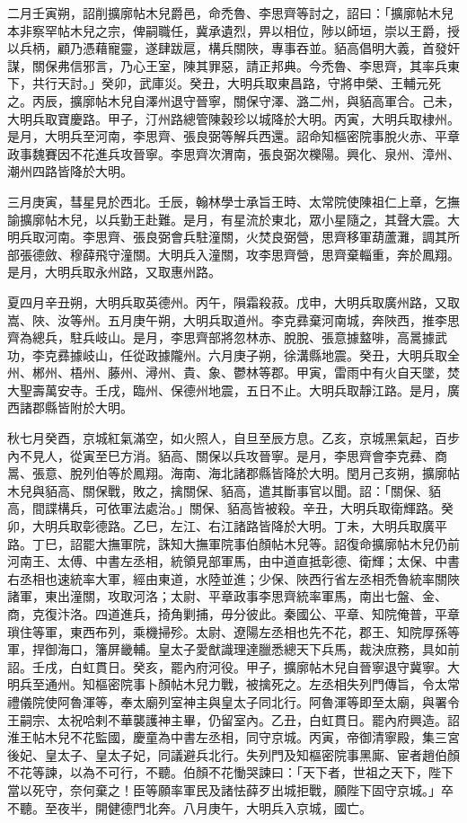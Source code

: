 \begin{pinyinscope}
 二月壬寅朔，詔削擴廓帖木兒爵邑，命禿魯、李思齊等討之，詔曰：「擴廓帖木兒本非察罕帖木兒之宗，俾嗣職任，冀承遺烈，畀以相位，陟以師垣，崇以王爵，授以兵柄，顧乃憑藉寵靈，遂肆跋扈，構兵關陜，專事吞並。貊高倡明大義，首發奸謀，關保弗信邪言，乃心王室，陳其罪惡，請正邦典。今禿魯、李思齊，其率兵東下，共行天討。」癸卯，武庫災。癸丑，大明兵取東昌路，守將申榮、王輔元死之。丙辰，擴廓帖木兒自澤州退守晉寧，關保守澤、潞二州，與貊高軍合。己未，大明兵取寶慶路。甲子，汀州路總管陳穀珍以城降於大明。丙寅，大明兵取棣州。是月，大明兵至河南，李思齊、張良弼等解兵西還。詔命知樞密院事脫火赤、平章政事魏賽因不花進兵攻晉寧。李思齊次渭南，張良弼次櫟陽。興化、泉州、漳州、潮州四路皆降於大明。



 三月庚寅，彗星見於西北。壬辰，翰林學士承旨王時、太常院使陳祖仁上章，乞撫諭擴廓帖木兒，以兵勤王赴難。是月，有星流於東北，眾小星隨之，其聲大震。大明兵取河南。李思齊、張良弼會兵駐潼關，火焚良弼營，思齊移軍葫蘆灘，調其所部張德斂、穆薛飛守潼關。大明兵入潼關，攻李思齊營，思齊棄輜重，奔於鳳翔。是月，大明兵取永州路，又取惠州路。



 夏四月辛丑朔，大明兵取英德州。丙午，隕霜殺菽。戊申，大明兵取廣州路，又取嵩、陜、汝等州。五月庚午朔，大明兵取道州。李克彞棄河南城，奔陜西，推李思齊為總兵，駐兵岐山。是月，李思齊部將忽林赤、脫脫、張意據盩啡，高暠據武功，李克彞據岐山，任從政據隴州。六月庚子朔，徐溝縣地震。癸丑，大明兵取全州、郴州、梧州、藤州、潯州、貴、象、鬱林等郡。甲寅，雷雨中有火自天墜，焚大聖壽萬安寺。壬戌，臨州、保德州地震，五日不止。大明兵取靜江路。是月，廣西諸郡縣皆附於大明。



 秋七月癸酉，京城紅氣滿空，如火照人，自旦至辰方息。乙亥，京城黑氣起，百步內不見人，從寅至巳方消。貊高、關保以兵攻晉寧。是月，李思齊會李克彞、商暠、張意、脫列伯等於鳳翔。海南、海北諸郡縣皆降於大明。閏月己亥朔，擴廓帖木兒與貊高、關保戰，敗之，擒關保、貊高，遣其斷事官以聞。詔：「關保、貊高，間諜構兵，可依軍法處治。」關保、貊高皆被殺。辛丑，大明兵取衛輝路。癸卯，大明兵取彰德路。乙巳，左江、右江諸路皆降於大明。丁未，大明兵取廣平路。丁巳，詔罷大撫軍院，誅知大撫軍院事伯顏帖木兒等。詔復命擴廓帖木兒仍前河南王、太傅、中書左丞相，統領見部軍馬，由中道直抵彰德、衛輝；太保、中書右丞相也速統率大軍，經由東道，水陸並進；少保、陜西行省左丞相禿魯統率關陜諸軍，東出潼關，攻取河洛；太尉、平章政事李思齊統率軍馬，南出七盤、金、商，克復汴洛。四道進兵，掎角剿捕，毋分彼此。秦國公、平章、知院俺普，平章瑣住等軍，東西布列，乘機掃殄。太尉、遼陽左丞相也先不花，郡王、知院厚孫等軍，捍御海口，籓屏畿輔。皇太子愛猷識理達臘悉總天下兵馬，裁決庶務，具如前詔。壬戌，白虹貫日。癸亥，罷內府河役。甲子，擴廓帖木兒自晉寧退守冀寧。大明兵至通州。知樞密院事卜顏帖木兒力戰，被擒死之。左丞相失列門傳旨，令太常禮儀院使阿魯渾等，奉太廟列室神主與皇太子同北行。阿魯渾等即至太廟，與署令王嗣宗、太祝哈剌不華襲護神主畢，仍留室內。乙丑，白虹貫日。罷內府興造。詔淮王帖木兒不花監國，慶童為中書左丞相，同守京城。丙寅，帝御清寧殿，集三宮後妃、皇太子、皇太子妃，同議避兵北行。失列門及知樞密院事黑廝、宦者趙伯顏不花等諫，以為不可行，不聽。伯顏不花慟哭諫曰：「天下者，世祖之天下，陛下當以死守，奈何棄之！臣等願率軍民及諸怯薛歹出城拒戰，願陛下固守京城。」卒不聽。至夜半，開健德門北奔。八月庚午，大明兵入京城，國亡。




\end{pinyinscope}

